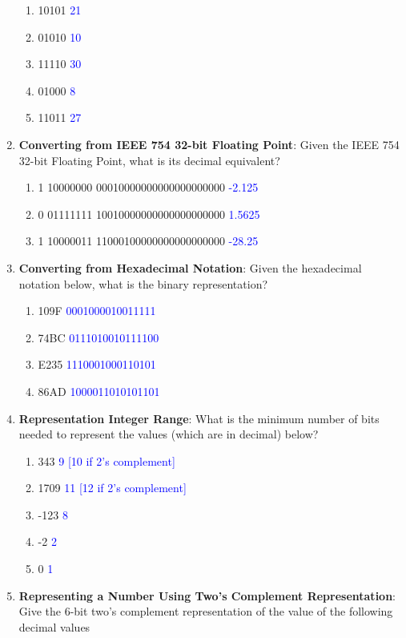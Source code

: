 \documentclass{article}
\begin{document}
\begin{enumerate}[label=(\alph*)]
\begin{enumerate}[label=(\roman*)]
        \item 10101 \textcolor{blue}{21}
        \item 01010 \textcolor{blue}{10}
        \item 11110 \textcolor{blue}{30}
        \item 01000 \textcolor{blue}{8}
        \item 11011 \textcolor{blue}{27}
    \end{enumerate}
    \item \textbf{Converting from IEEE 754 32-bit Floating Point}: Given the IEEE 754 32-bit Floating Point, what is its decimal equivalent?
    \begin{enumerate}[label=(\roman*)]
        \item 1 10000000 00010000000000000000000 \textcolor{blue}{-2.125}
        \item 0 01111111 10010000000000000000000 \textcolor{blue}{1.5625}
        \item 1 10000011 11000100000000000000000 \textcolor{blue}{-28.25}
    \end{enumerate}
    \newpage
    \item \textbf{Converting from Hexadecimal Notation}: Given the hexadecimal notation below, what is the binary representation?
    \begin{enumerate}[label=(\roman*)]
        \item 109F \textcolor{blue}{0001000010011111}
        \item 74BC \textcolor{blue}{0111010010111100}
        \item E235 \textcolor{blue}{1110001000110101}
        \item 86AD \textcolor{blue}{1000011010101101}
    \end{enumerate}
    \item \textbf{Representation Integer Range}: What is the minimum number of bits needed to represent the values (which are in decimal) below?
    \begin{enumerate}[label=(\roman*)]
        \item 343 \textcolor{blue}{9 [10 if 2’s complement]}
        \item 1709 \textcolor{blue}{11 [12 if 2’s complement]}
        \item -123 \textcolor{blue}{8}
        \item -2 \textcolor{blue}{2}
        \item 0 \textcolor{blue}{1}
    \end{enumerate}
    \item \textbf{Representing a Number Using Two's Complement Representation}: Give the 6-bit two's complement representation of the value of the following decimal values

\end{enumerate}
\end{document}
